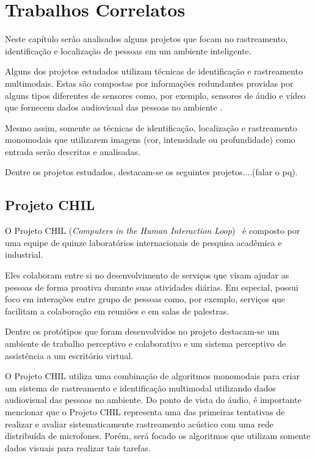 \chapter{Trabalhos Correlatos}

Neste capítulo serão analisados alguns projetos que focam no rastreamento, identificação e localização de pessoas em um ambiente inteligente. 

Alguns dos projetos estudados utilizam técnicas de identificação e rastreamento multimodais. Estas são compostas por informações redundantes providas por alguns tipos diferentes de sensores como, por exemplo, sensores de áudio e vídeo que fornecem dados audiovisual  das pessoas no ambiente .

Mesmo assim, somente as técnicas de identificação, localização e rastreamento monomodais que utilizarem imagens (cor, intensidade ou profundidade) como entrada serão descritas e analisadas.

Dentre os projetos estudados, destacam-se os seguintes projetos....(falar o pq).

\section{Projeto CHIL}

O Projeto CHIL (\textit{Computers in the Human Interaction Loop})~\cite{chil, computerschil} é composto por uma equipe de quinze laboratórios internacionais de pesquisa acadêmica e industrial.

Eles colaboram entre si no desenvolvimento de serviços que visam ajudar as pessoas de forma proativa durante suas atividades diárias. Em especial, possui foco em interações entre grupo de pessoas como, por exemplo, serviços que facilitam a colaboração em reuniões e em salas de palestras. 

Dentre os protótipos que foram desenvolvidos no projeto destacam-se um ambiente de trabalho perceptivo e colaborativo e um sistema perceptivo de assistência a um escritório virtual.

O Projeto CHIL utiliza uma combinação de algoritmos monomodais para criar um sistema de rastreamento e identificação multimodal utilizando dados audiovisual das pessoas no ambiente. Do ponto de vista do áudio, é importante mencionar que o Projeto CHIL representa uma das primeiras tentativas de realizar e avaliar sistematicamente rastreamento acústico com uma rede distribuída de microfones. Porém, será focado os algoritmos que utilizam somente dados visuais para realizar tais tarefas.

